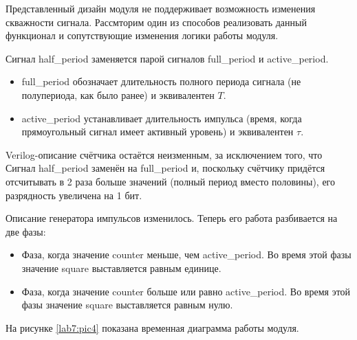 Представленный дизайн модуля не поддерживает возможность изменения скважности сигнала. Рассмторим один из способов реализовать данный функционал и сопутствующие изменения логики работы модуля.

Сигнал half\_period заменяется парой сигналов full\_period и active\_period. 

\begin{itemize}
\item full\_period обозначает длительность полного периода сигнала (не полупериода, как было ранее) и эквивалентен $T$.
\item active\_period устанавливает длительность импульса (время, когда прямоугольный сигнал имеет активный уровень) и эквивалентен $\tau$.
\end{itemize}
\noindent
\begin{minipage}{\linewidth}
	
\end{minipage}


Verilog-описание счётчика остаётся неизменным, за исключением того, что Сигнал half\_period заменён на full\_period и, поскольку счётчику придётся отсчитывать в 2 раза больше значений (полный период вместо половины), его разрядность увеличена на 1 бит.

\noindent
\begin{minipage}{\linewidth}
	
\end{minipage}


Описание генератора импульсов изменилось. Теперь его работа разбивается на две фазы:
\begin{itemize}
	\item Фаза, когда значение counter меньше, чем active\_period. Во время этой фазы значение square выставляется равным единице.
	\item Фаза, когда значение counter больше или равно active\_period. Во время этой фазы значение square выставляется равным нулю.
\end{itemize}

\noindent
\begin{minipage}{\linewidth}
	
\end{minipage}

На рисунке \ref{lab7:pic4} показана временная диаграмма работы модуля.

